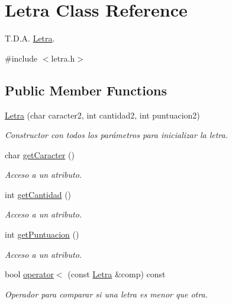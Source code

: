 \hypertarget{classLetra}{}\section{Letra Class Reference}
\label{classLetra}


T.\+D.\+A. \mbox{\hyperlink{classLetra}{Letra}}.  




{\ttfamily \#include $<$letra.\+h$>$}

\subsection*{Public Member Functions}
\begin{DoxyCompactItemize}
\item 
\mbox{\hyperlink{classLetra_a454348d5e8b5c9f8d8139f16b1ba6ee8}{Letra}} (char caracter2, int cantidad2, int puntuacion2)
\begin{DoxyCompactList}\small\item\em Constructor con todos los parámetros para inicializar la letra. \end{DoxyCompactList}\item 
char \mbox{\hyperlink{classLetra_a79514bd663bd54773bcb51f44df763df}{get\+Caracter}} ()
\begin{DoxyCompactList}\small\item\em Acceso a un atributo. \end{DoxyCompactList}\item 
int \mbox{\hyperlink{classLetra_a2028cf9ec2079e55aa5aedb1fb2dc546}{get\+Cantidad}} ()
\begin{DoxyCompactList}\small\item\em Acceso a un atributo. \end{DoxyCompactList}\item 
int \mbox{\hyperlink{classLetra_a6704e1b0e839f5c57b12f1f72148090b}{get\+Puntuacion}} ()
\begin{DoxyCompactList}\small\item\em Acceso a un atributo. \end{DoxyCompactList}\item 
bool \mbox{\hyperlink{classLetra_adcc529a3890dc3ee7bfef9ca1fb4124f}{operator$<$}} (const \mbox{\hyperlink{classLetra}{Letra}} \&comp) const
\begin{DoxyCompactList}\small\item\em Operador para comparar si una letra es menor que otra. \end{DoxyCompactList}\end{DoxyCompactItemize}
